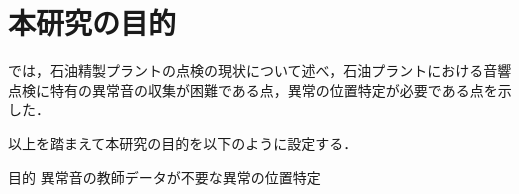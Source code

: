 \documentclass[../main]{subfiles}
\begin{document}
\section{本研究の目的}
\label{sec:intro_my_purpose}

では，石油精製プラントの点検の現状について述べ，石油プラントにおける音響点検に特有の異常音の収集が困難である点，異常の位置特定が必要である点を示した．



以上を踏まえて本研究の目的を以下のように設定する．
\bigskip
\begin{itembox}[c]{目的}
  \centering
  異常音の教師データが不要な異常の位置特定
\end{itembox}
\end{document}
